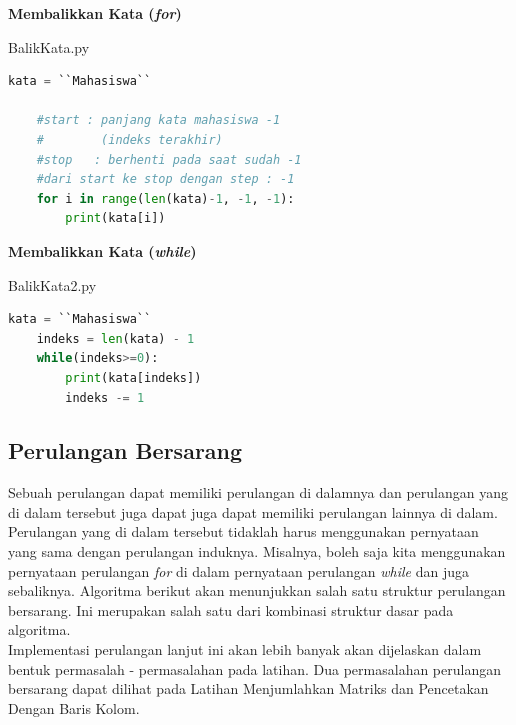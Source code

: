 \begin{enumerate}
\begin{contoh}
	\textbf{Membalikkan Kata (\textit{for})}
\begin{listprog}{BalikKata.py}
\label{lst:BalikKata}
\begin{lstlisting}[language=Python]
	kata = ``Mahasiswa``
	
	#start : panjang kata mahasiswa -1 
	#        (indeks terakhir)
	#stop	: berhenti pada saat sudah -1
	#dari start ke stop dengan step : -1
	for i in range(len(kata)-1, -1, -1):
		print(kata[i])
\end{lstlisting}
\end{listprog}
\end{contoh}

\begin{contoh}
	\textbf{Membalikkan Kata (\textit{while})}
\begin{listprog}{BalikKata2.py}
\label{lst:BalikKata2}
\begin{lstlisting}[language=Python]
	kata = ``Mahasiswa``
	indeks = len(kata) - 1
	while(indeks>=0):
		print(kata[indeks])
		indeks -= 1
	\end{lstlisting}
\end{listprog}
\end{contoh}
\end{enumerate}

\FloatBarrier
\subsection{Perulangan Bersarang}
Sebuah perulangan dapat memiliki perulangan di dalamnya dan perulangan yang di dalam tersebut juga dapat juga dapat memiliki perulangan lainnya di dalam. Perulangan yang di dalam tersebut tidaklah harus menggunakan pernyataan yang sama dengan perulangan induknya. Misalnya, boleh saja kita menggunakan pernyataan perulangan \textit{for} di dalam pernyataan perulangan \textit{while} dan juga sebaliknya. Algoritma berikut akan menunjukkan salah satu struktur perulangan bersarang. Ini merupakan salah satu dari kombinasi struktur dasar pada algoritma. \\

Implementasi perulangan lanjut ini akan lebih banyak akan dijelaskan dalam bentuk permasalah - permasalahan pada latihan. Dua permasalahan perulangan bersarang dapat dilihat pada Latihan Menjumlahkan Matriks dan Pencetakan Dengan Baris Kolom.



